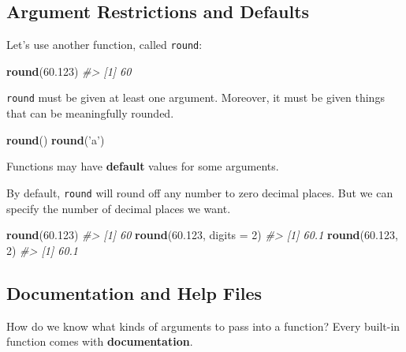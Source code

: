 \documentclass[
]{book}
\newenvironment{Shaded}{\begin{snugshade}}{\end{snugshade}}
\newcommand{\CommentTok}[1]{\textcolor[rgb]{0.56,0.35,0.01}{\textit{#1}}}
\newcommand{\DataTypeTok}[1]{\textcolor[rgb]{0.13,0.29,0.53}{#1}}
\newcommand{\DecValTok}[1]{\textcolor[rgb]{0.00,0.00,0.81}{#1}}
\newcommand{\FloatTok}[1]{\textcolor[rgb]{0.00,0.00,0.81}{#1}}
\newcommand{\KeywordTok}[1]{\textcolor[rgb]{0.13,0.29,0.53}{\textbf{#1}}}
\newcommand{\NormalTok}[1]{#1}
\newcommand{\StringTok}[1]{\textcolor[rgb]{0.31,0.60,0.02}{#1}}
\begin{document}
\hypertarget{argument-restrictions-and-defaults}{%
\subsection{Argument Restrictions and Defaults}\label{argument-restrictions-and-defaults}}

Let's use another function, called \texttt{round}:

\begin{Shaded}
\begin{Highlighting}[]
\KeywordTok{round}\NormalTok{(}\FloatTok{60.123}\NormalTok{)}
\CommentTok{#> [1] 60}
\end{Highlighting}
\end{Shaded}

\texttt{round} must be given at least one argument. Moreover, it must be given things that can be meaningfully rounded.

\begin{Shaded}
\begin{Highlighting}[]
\KeywordTok{round}\NormalTok{()}
\KeywordTok{round}\NormalTok{(}\StringTok{'a'}\NormalTok{)}
\end{Highlighting}
\end{Shaded}

Functions may have \textbf{default} values for some arguments.

By default, \texttt{round} will round off any number to zero decimal places. But we can specify the number of decimal places we want.

\begin{Shaded}
\begin{Highlighting}[]
\KeywordTok{round}\NormalTok{(}\FloatTok{60.123}\NormalTok{)}
\CommentTok{#> [1] 60}
\KeywordTok{round}\NormalTok{(}\FloatTok{60.123}\NormalTok{, }\DataTypeTok{digits =} \DecValTok{2}\NormalTok{)}
\CommentTok{#> [1] 60.1}
\KeywordTok{round}\NormalTok{(}\FloatTok{60.123}\NormalTok{, }\DecValTok{2}\NormalTok{)}
\CommentTok{#> [1] 60.1}
\end{Highlighting}
\end{Shaded}

\hypertarget{documentation-and-help-files}{%
\subsection{Documentation and Help Files}\label{documentation-and-help-files}}

How do we know what kinds of arguments to pass into a function? Every built-in function comes with \textbf{documentation}.
\end{document}
